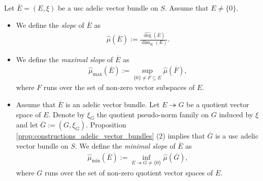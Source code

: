\documentclass [11pt,reqno]{amsart}
\newcommand{\1}{\mathmybb{1}}
\begin{document}
\begin{definition}
\label{def:slopes_proper}
Let $\overline{E}=(E,\xi)$ be a usc adelic vector bundle on $S$. Assume that $E\neq \{0\}$.
\begin{itemize}
	\item[(1)] We define the \emph{slope} of $\overline{E}$ as 
	\begin{align*}
	\widehat{\mu}(\overline{E}) := \frac{\widehat{\deg}(\overline{E})}{\dim_{K}(E)}.
	\end{align*}
	\item[(2)] We define the \emph{maximal slope} of $\overline{E}$ as
	\begin{align*}
	\widehat{\mu}_{\max}(\overline{E}) := \displaystyle\sup_{\{0\}\neq F \subseteq E} \widehat{\mu}(\overline{F}),
	\end{align*}
	where $F$ runs over the set of non-zero vector subspaces of $E$. 
	\item[(3)] Assume that $\overline{E}$ is an adelic vector bundle. Let $E \twoheadrightarrow G$ be a quotient vector space of $E$. Denote by $\xi_G$ the quotient pseudo-norm family on $G$ induced by $\xi$ and let $\overline{G}:=(G,\xi_G)$. Proposition \ref{prop:constructions_adelic_vector_bundles} (2) implies that $\overline{G}$ is a usc adelic vector bundle on $S$. We define the \emph{minimal slope} of $\overline{E}$ as 
	\begin{align*}
	\widehat{\mu}_{\min}(\overline{E}) := \displaystyle\inf_{E \twoheadrightarrow G \neq \{0\} } \widehat{\mu}(\overline{G}),
	\end{align*}
	where $G$ runs over the set of non-zero quotient vector spaces of $E$.
\end{itemize}
\end{definition}
\end{document}
